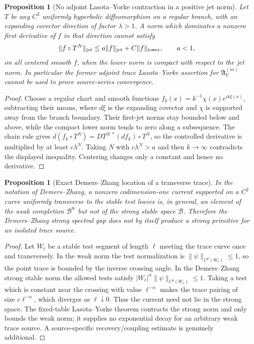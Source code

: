 \documentclass[11pt]{amsart}
\theoremstyle{compactplain}
\newtheorem{proposition}[theorem]{Proposition}
\theoremstyle{compactdefinition}
\theoremstyle{compactremark}
\newcommand{\Bcal}{\mathcal B}
\newcommand{\Bweak}{\mathcal B^{\mathrm w}}
\begin{document}
\begin{proposition}[No adjoint Lasota--Yorke contraction in a positive jet norm]
\label{prop:no_adjoint_jet_contraction}
Let \(T\) be any \(C^2\) uniformly hyperbolic diffeomorphism on a regular
branch, with an expanding covector direction of factor \(\lambda>1\).  A norm
which dominates a nonzero first derivative of \(f\) in that direction cannot
satisfy
\[
 \|f\circ T^{N}\|_{\rm jet}
 \le a\|f\|_{\rm jet}+C\|f\|_{\rm lower},\qquad a<1,
\]
on all centered smooth \(f\), when the lower norm is compact with respect to
the jet norm.  In particular the former adjoint trace Lasota--Yorke assertion
for \(\mathfrak A_U^{(m)}\) cannot be used to prove source-series convergence.
\end{proposition}

\begin{proof}
Choose a regular chart and smooth functions
\(f_k(x)=k^{-1}\chi(x)e^{ik\xi(x)}\), subtracting their means, where
\(d\xi\) is the expanding covector and \(\chi\) is supported away from the
branch boundary.  Their first-jet norms stay bounded below and above, while
the compact lower norm tends to zero along a subsequence.  The chain rule gives
\(d(f_k\circ T^N)=D T^{N\,*}(df_k)\circ T^N\), so the controlled derivative is
multiplied by at least \(c\lambda^N\).  Taking \(N\) with
\(c\lambda^N>a\) and then \(k\to\infty\) contradicts the displayed
inequality.  Centering changes only a constant and hence no derivative.
\end{proof}

\begin{proposition}[Exact Demers--Zhang location of a transverse trace]
\label{prop:demers_zhang_trace_location}
In the notation of Demers--Zhang, a nonzero codimension-one current supported
on a \(C^2\) curve uniformly transverse to the stable test leaves is, in
general, an element of the weak completion \(\Bweak\) but not of the strong
stable space \(\Bcal\).  Therefore the Demers--Zhang strong spectral gap does
not by itself produce a strong primitive for an isolated trace source.
\end{proposition}

\begin{proof}
Let \(W_\ell\) be a stable test segment of length \(\ell\) meeting the trace
curve once and transversely.  In the weak norm the test normalization is
\(\|\psi\|_{C^p(W_\ell)}\le1\), so the point trace is bounded by the inverse
crossing angle.  In the Demers--Zhang strong stable norm the allowed tests
satisfy \(|W_\ell|^\alpha\|\psi\|_{C^q(W_\ell)}\le1\).  Taking a test which is
constant near the crossing with value \(\ell^{-\alpha}\) makes the trace
pairing of size \(c\ell^{-\alpha}\), which diverges as \(\ell\downarrow0\).
Thus the current need not lie in the strong space.  The fixed-table
Lasota--Yorke theorem contracts the strong norm and only bounds the weak norm;
it supplies no exponential decay for an arbitrary weak trace source.  A
source-specific recovery/coupling estimate is genuinely additional.
\end{proof}
\end{document}

